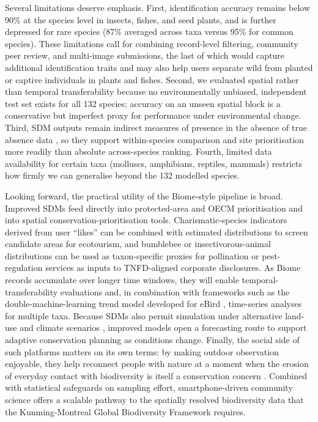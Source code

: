 \documentclass[11pt]{article}
\begin{document}
Several limitations deserve emphasis. First, identification accuracy remains below 90\% at the species level in insects, fishes, and seed plants, and is further depressed for rare species (87\% averaged across taxa versus 95\% for common species). These limitations call for combining record-level filtering, community peer review, and multi-image submissions, the last of which would capture additional identification traits and may also help users separate wild from planted or captive individuals in plants and fishes. Second, we evaluated spatial rather than temporal transferability because no environmentally unbiased, independent test set exists for all 132 species; accuracy on an unseen spatial block is a conservative but imperfect proxy for performance under environmental change. Third, SDM outputs remain indirect measures of presence in the absence of true absence data \citep{elith2011statistical}, so they support within-species comparison and site prioritisation more readily than absolute across-species ranking. Fourth, limited data availability for certain taxa (molluscs, amphibians, reptiles, mammals) restricts how firmly we can generalise beyond the 132 modelled species.

Looking forward, the practical utility of the Biome-style pipeline is broad. Improved SDMs feed directly into protected-area and OECM prioritisation and into spatial conservation-prioritisation tools. Charismatic-species indicators derived from user ``likes'' can be combined with estimated distributions to screen candidate areas for ecotourism, and bumblebee or insectivorous-animal distributions can be used as taxon-specific proxies for pollination or pest-regulation services as inputs to TNFD-aligned corporate disclosures. As Biome records accumulate over longer time windows, they will enable temporal-transferability evaluations and, in combination with frameworks such as the double-machine-learning trend model developed for eBird \citep{fink2023double}, time-series analyses for multiple taxa. Because SDMs also permit simulation under alternative land-use and climate scenarios \citep{porfirio2014improving}, improved models open a forecasting route to support adaptive conservation planning as conditions change. Finally, the social side of such platforms matters on its own terms: by making outdoor observation enjoyable, they help reconnect people with nature at a moment when the erosion of everyday contact with biodiversity is itself a conservation concern \citep{soga2023biophobia}. Combined with statistical safeguards on sampling effort, smartphone-driven community science offers a scalable pathway to the spatially resolved biodiversity data that the Kunming-Montreal Global Biodiversity Framework requires.



\end{document}
